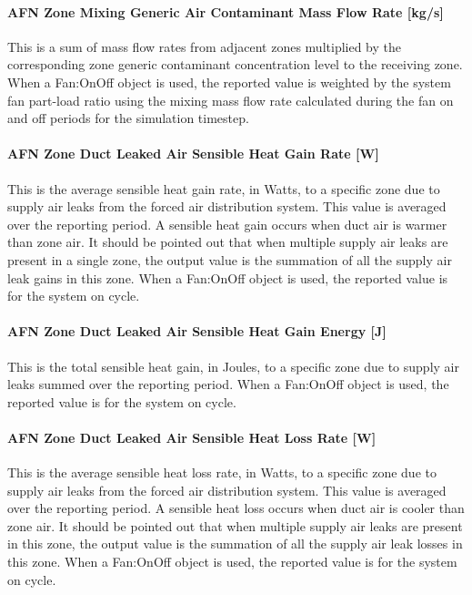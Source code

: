 \paragraph{AFN Zone Mixing Generic Air Contaminant Mass Flow Rate {[}kg/s{]}}\label{afn-zone-mixing-generic-air-contaminant-mass-flow-rate-kgs}

This is a sum of mass flow rates from adjacent zones multiplied by the corresponding zone generic contaminant concentration level to the receiving zone. When a Fan:OnOff object is used, the reported value is weighted by the system fan part-load ratio using the mixing mass flow rate calculated during the fan on and off periods for the simulation timestep.

\paragraph{AFN Zone Duct Leaked Air Sensible Heat Gain Rate {[}W{]}}\label{afn-zone-duct-leaked-air-sensible-heat-gain-rate-w}

This is the average sensible heat gain rate, in Watts, to a specific zone due to supply air leaks from the forced air distribution system. This value is averaged over the reporting period. A sensible heat gain occurs when duct air is warmer than zone air. It should be pointed out that when multiple supply air leaks are present in a single zone, the output value is the summation of all the supply air leak gains in this zone. When a Fan:OnOff object is used, the reported value is for the system on cycle.

\paragraph{AFN Zone Duct Leaked Air Sensible Heat Gain Energy {[}J{]}}\label{afn-zone-duct-leaked-air-sensible-heat-gain-energy-j}

This is the total sensible heat gain, in Joules, to a specific zone due to supply air leaks summed over the reporting period. When a Fan:OnOff object is used, the reported value is for the system on cycle.

\paragraph{AFN Zone Duct Leaked Air Sensible Heat Loss Rate {[}W{]}}\label{afn-zone-duct-leaked-air-sensible-heat-loss-rate-w}

This is the average sensible heat loss rate, in Watts, to a specific zone due to supply air leaks from the forced air distribution system. This value is averaged over the reporting period. A sensible heat loss occurs when duct air is cooler than zone air. It should be pointed out that when multiple supply air leaks are present in this zone, the output value is the summation of all the supply air leak losses in this zone. When a Fan:OnOff object is used, the reported value is for the system on cycle.

